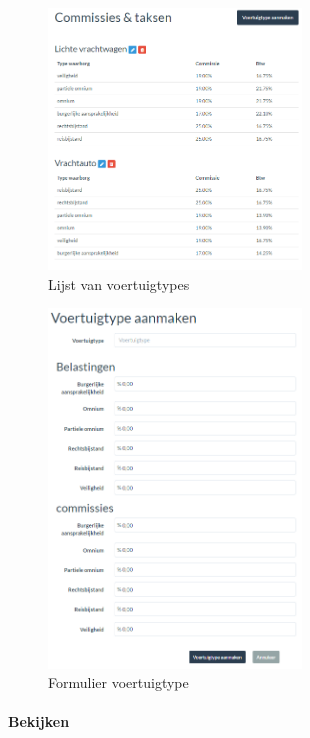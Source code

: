 \documentclass[11pt,openany]{article}
\begin{document}
\begin{figure}
	\centering
	\includegraphics[width=0.6\textwidth]{img/fig32.png}
	\caption{Lijst van voertuigtypes} 
	\label{fig:32} 
\end{figure}
\begin{figure}
	\centering
	\includegraphics[width=0.6\textwidth]{img/fig33.png}
	\caption{Formulier voertuigtype} 
	\label{fig:33} 
\end{figure}
\newpage
\paragraph{Bekijken}
\end{document}
